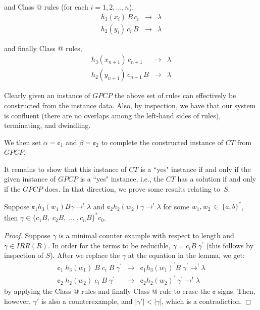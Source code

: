 \documentclass{lmcs} %
\makeatletter
\theoremstyle{plain}\newtheorem{satz}[thm]{Satz} %
\newcommand*{\rom}[1]{\expandafter\@slowromancap\romannumeral #1@}
\makeatother
\begin{document}
and Class \rom{2} rules (for each $i = 1, 2, \ldots, n$),
\begin{eqnarray*} h_3(x_i)\,B\,c_i & \rightarrow & \lambda \\
h_2(y_i)\,c_i\,B & \rightarrow & \lambda
\end{eqnarray*}

and finally Class \rom{3} rules,
\begin{eqnarray*} h_3(x_{n+1})\,c_{n+1} & \rightarrow & \lambda \\
h_2(y_{n+1})\,c_{n+1}\,B & \rightarrow & \lambda
\end{eqnarray*}

Clearly given an instance of $GPCP$ the above set of rules can
effectively be constructed from the instance data. Also, by
inspection, we have that our system is confluent (there are no
overlaps among the left-hand sides of rules), terminating, and
dwindling.

We then set $\alpha = \cent_1$ and $\beta = \cent_2$ to complete the
constructed instance of $CT$ from~$GPCP$.

It remains to show that this instance of $CT$ is a ``yes" instance if
and only if the given instance of $GPCP$ is a ``yes" instance, i.e.,
the $CT$ has a solution if and only if the $GPCP$ does. In that
direction, we prove some results relating to~$S$.

\begin{lem}\label{FirstStep} Suppose $\cent_1 h_3(w_1) B \gamma
\rightarrow^{!} \lambda$ and $\cent_2 h_2(w_2) \gamma \rightarrow^{!}
\lambda$ for some $w_1, w_2 \, \in \, \{a,b\}_{}^*$, then $\gamma \in
\{c_1B,\;c_2B,\;...\;,c_nB\}_{}^{*} c_0$.
  \end{lem}

  \begin{proof} Suppose $\gamma$ is a minimal counter example with
respect to length and $\gamma \in IRR(R)$. In order for the terms to
be reducible, $\gamma = c_iB\; \gamma^\prime$ (this follows by
inspection of $S$).  After we replace the $\gamma$ at the equation in
the lemma, we get:
    \begin{eqnarray*} \cent_1 \;h_3(w_1)\; B\; c_i\; B\; \gamma^\prime
& \rightarrow & \cent_1 {h_3(w_1)}^\prime B\; \gamma^\prime
\rightarrow^{!} \lambda \\ \cent_2 \;h_2(w_2)\; c_i\; B\;
\gamma^\prime & \rightarrow & \cent_2 {h_2(w_2)}^\prime \;
\gamma^\prime \rightarrow^{!} \lambda
    \end{eqnarray*}
    \noindent by applying the Class \rom{2} rules and finally Class
\rom{1} rule to erase the $\cent$ signs.  Then, however, $\gamma'$ is
also a counterexample, and $| \gamma' | < | \gamma |$, which is a
contradiction.
  \end{proof}
\end{document}
